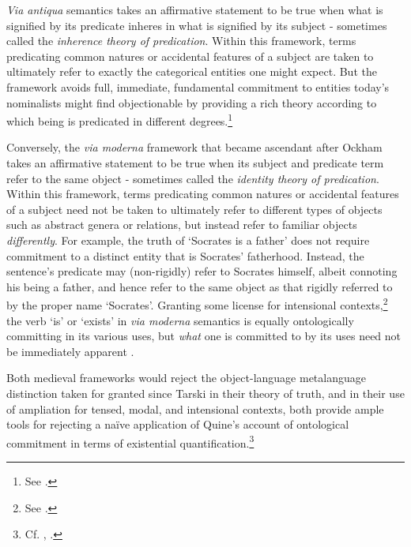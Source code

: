 \documentclass[]{article}
\begin{document}
\emph{Via antiqua} semantics takes an affirmative statement to be true when what is signified by its predicate inheres in what is signified by its subject - 
sometimes called the \emph{inherence theory of predication}. 
Within this framework, 
terms predicating common natures or accidental features of a subject are taken to ultimately refer to exactly the categorical entities one might expect. 
But the framework 
avoids full, immediate, fundamental commitment to entities today's nominalists might find objectionable by providing a rich theory according to which being is predicated in different degrees.\footnote{See \autocite{Klima2002}.}

Conversely, the \emph{via moderna} framework that became ascendant after Ockham 
takes an affirmative statement to be true when its subject and predicate term refer to the same object 
 - sometimes called the \emph{identity theory of predication}. 
Within this framework, 
terms predicating common natures or accidental features of a subject need not be taken to ultimately refer to different types of objects such as abstract genera or relations, 
but instead refer to familiar objects \emph{differently}. 
For example, the truth of `Socrates is a father' does not require commitment to a distinct entity that is Socrates' fatherhood.
Instead, the sentence's predicate may (non-rigidly) refer to Socrates himself, 
albeit connoting his being a father, 
and hence refer to the same object as that rigidly referred to by the proper name `Socrates'. 
Granting some license for intensional contexts,\footnote{See \autocite{Klima2005}.} 
the verb `is' or `exists' in \emph{via moderna} semantics is equally ontologically committing in its various uses, 
but \emph{what} one is committed to by its uses need not be immediately apparent  \autocite[437-430]{Klima2008a}. 

Both medieval frameworks would reject the object-language metalanguage distinction taken for granted since Tarski in their theory of truth, 
and 
in their use of ampliation for tensed, modal, and intensional contexts,
both provide ample tools for rejecting a na\"{i}ve application of Quine's account of ontological commitment in terms of existential quantification.\footnote{Cf. \autocite{Klima2004}, 
\autocite[171-174]{Klima2009}.}
\end{document}
